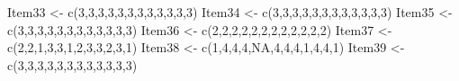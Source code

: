 \documentclass[
  english,
]{book}
\newenvironment{Shaded}{\begin{snugshade}}{\end{snugshade}}
\newcommand{\ConstantTok}[1]{\textcolor[rgb]{0.00,0.00,0.00}{#1}}
\newcommand{\DecValTok}[1]{\textcolor[rgb]{0.00,0.00,0.81}{#1}}
\newcommand{\FunctionTok}[1]{\textcolor[rgb]{0.00,0.00,0.00}{#1}}
\newcommand{\NormalTok}[1]{#1}
\newcommand{\OtherTok}[1]{\textcolor[rgb]{0.56,0.35,0.01}{#1}}
\begin{document}
\begin{Shaded}
\begin{Highlighting}[]
\NormalTok{Item33 }\OtherTok{\textless{}{-}} \FunctionTok{c}\NormalTok{(}\DecValTok{3}\NormalTok{,}\DecValTok{3}\NormalTok{,}\DecValTok{3}\NormalTok{,}\DecValTok{3}\NormalTok{,}\DecValTok{3}\NormalTok{,}\DecValTok{3}\NormalTok{,}\DecValTok{3}\NormalTok{,}\DecValTok{3}\NormalTok{,}\DecValTok{3}\NormalTok{,}\DecValTok{3}\NormalTok{,}\DecValTok{3}\NormalTok{,}\DecValTok{3}\NormalTok{)}
\NormalTok{Item34 }\OtherTok{\textless{}{-}} \FunctionTok{c}\NormalTok{(}\DecValTok{3}\NormalTok{,}\DecValTok{3}\NormalTok{,}\DecValTok{3}\NormalTok{,}\DecValTok{3}\NormalTok{,}\DecValTok{3}\NormalTok{,}\DecValTok{3}\NormalTok{,}\DecValTok{3}\NormalTok{,}\DecValTok{3}\NormalTok{,}\DecValTok{3}\NormalTok{,}\DecValTok{3}\NormalTok{,}\DecValTok{3}\NormalTok{,}\DecValTok{3}\NormalTok{)}
\NormalTok{Item35 }\OtherTok{\textless{}{-}} \FunctionTok{c}\NormalTok{(}\DecValTok{3}\NormalTok{,}\DecValTok{3}\NormalTok{,}\DecValTok{3}\NormalTok{,}\DecValTok{3}\NormalTok{,}\DecValTok{3}\NormalTok{,}\DecValTok{3}\NormalTok{,}\DecValTok{3}\NormalTok{,}\DecValTok{3}\NormalTok{,}\DecValTok{3}\NormalTok{,}\DecValTok{3}\NormalTok{,}\DecValTok{3}\NormalTok{,}\DecValTok{3}\NormalTok{)}
\NormalTok{Item36 }\OtherTok{\textless{}{-}} \FunctionTok{c}\NormalTok{(}\DecValTok{2}\NormalTok{,}\DecValTok{2}\NormalTok{,}\DecValTok{2}\NormalTok{,}\DecValTok{2}\NormalTok{,}\DecValTok{2}\NormalTok{,}\DecValTok{2}\NormalTok{,}\DecValTok{2}\NormalTok{,}\DecValTok{2}\NormalTok{,}\DecValTok{2}\NormalTok{,}\DecValTok{2}\NormalTok{,}\DecValTok{2}\NormalTok{,}\DecValTok{2}\NormalTok{)}
\NormalTok{Item37 }\OtherTok{\textless{}{-}} \FunctionTok{c}\NormalTok{(}\DecValTok{2}\NormalTok{,}\DecValTok{2}\NormalTok{,}\DecValTok{1}\NormalTok{,}\DecValTok{3}\NormalTok{,}\DecValTok{3}\NormalTok{,}\DecValTok{1}\NormalTok{,}\DecValTok{2}\NormalTok{,}\DecValTok{3}\NormalTok{,}\DecValTok{3}\NormalTok{,}\DecValTok{2}\NormalTok{,}\DecValTok{3}\NormalTok{,}\DecValTok{1}\NormalTok{)}
\NormalTok{Item38 }\OtherTok{\textless{}{-}} \FunctionTok{c}\NormalTok{(}\DecValTok{1}\NormalTok{,}\DecValTok{4}\NormalTok{,}\DecValTok{4}\NormalTok{,}\DecValTok{4}\NormalTok{,}\ConstantTok{NA}\NormalTok{,}\DecValTok{4}\NormalTok{,}\DecValTok{4}\NormalTok{,}\DecValTok{4}\NormalTok{,}\DecValTok{1}\NormalTok{,}\DecValTok{4}\NormalTok{,}\DecValTok{4}\NormalTok{,}\DecValTok{1}\NormalTok{)}
\NormalTok{Item39 }\OtherTok{\textless{}{-}} \FunctionTok{c}\NormalTok{(}\DecValTok{3}\NormalTok{,}\DecValTok{3}\NormalTok{,}\DecValTok{3}\NormalTok{,}\DecValTok{3}\NormalTok{,}\DecValTok{3}\NormalTok{,}\DecValTok{3}\NormalTok{,}\DecValTok{3}\NormalTok{,}\DecValTok{3}\NormalTok{,}\DecValTok{3}\NormalTok{,}\DecValTok{3}\NormalTok{,}\DecValTok{3}\NormalTok{,}\DecValTok{3}\NormalTok{)}

\end{Highlighting}
\end{Shaded}
\end{document}
